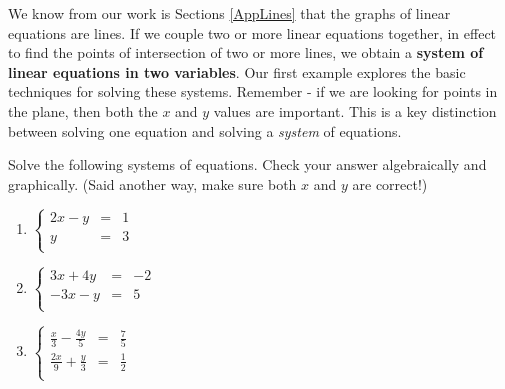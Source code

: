 \documentclass{ximera}
\begin{document}
 

We know from our work is Sections \ref{AppLines} that the graphs of linear equations are lines.  If we couple two or more linear equations together, in effect to find the points of intersection of two or more lines, we obtain a \textbf{system of linear equations in two variables}.  Our first example explores the basic techniques for solving these systems.  Remember - if we are looking for points in the plane, then both the $x$ and $y$ values are important.  This is a key distinction between solving one equation and solving a \emph{system} of equations.

\begin{example} \label{reviewsubelim}  Solve the following systems of equations.  Check your answer algebraically and graphically.  (Said another way, make sure both $x$ and $y$ are correct!)


\begin{enumerate}

\item  $\left\{ \begin{array}{rcr} 2x - y & = & 1 \\ y & = & 3 \\ \end{array} \right.$ 

\item  $\left\{ \begin{array}{rcr} 3x+4y & = & -2  \\ -3x-y & = & 5 \\ \end{array} \right.$ 

\item  $\left\{ \begin{array}{rcr} \frac{x}{3} -\frac{4y}{5} & = & \frac{7}{5} \\   
\frac{2x}{9} + \frac{y}{3} & = & \frac{1}{2} \\ \end{array} \right.$


\end{enumerate}
\end{example}
\end{document}
